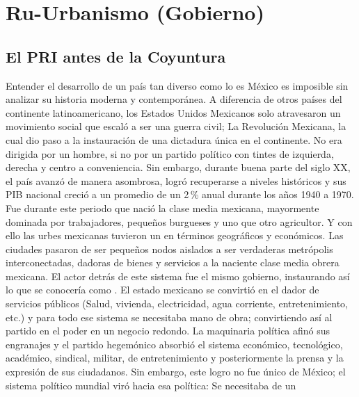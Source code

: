 
\section{Ru-Urbanismo (Gobierno)}
\label{sec:ru-urbanismo-gobierno}

\subsection{El PRI antes de la Coyuntura}
\label{ssec:PRI-pre-Coyuntura}

Entender el desarrollo de un país tan diverso como lo es México es imposible sin analizar su
historia moderna y contemporánea. A diferencia de otros países del continente latinoamericano, 
los Estados Unidos Mexicanos solo atravesaron un movimiento social que escaló a ser una guerra civil;
La Revolución Mexicana, la cual dio paso a la instauración de una dictadura única en el continente. No 
era dirigida por un hombre, si no por un partido político con tintes de izquierda, derecha y centro 
a conveniencia. Sin embargo, durante buena parte del siglo XX, el país avanzó de manera asombrosa, logró 
recuperarse a niveles históricos y sus PIB nacional creció a un promedio de un 2\,\% anual durante los años 
1940 a 1970. Fue durante este periodo que nació la clase media mexicana, mayormente dominada por trabajadores, 
pequeños burgueses y uno que otro agricultor. Y con ello las urbes mexicanas tuvieron un  en 
términos geográficos y económicos. Las ciudades pasaron de ser pequeños nodos aislados a ser verdaderas metrópolis
interconectadas, dadoras de bienes y servicios a la naciente clase media obrera mexicana. El actor detrás de este 
sistema fue el mismo gobierno, instaurando así lo que se conocería como . El estado 
mexicano se convirtió en el dador de servicios públicos (Salud, vivienda, electricidad, agua corriente, entretenimiento, etc.) 
y para todo ese sistema se necesitaba mano de obra; convirtiendo así al partido en el poder en un negocio redondo. 
La maquinaria política afinó sus engranajes y el partido hegemónico absorbió el sistema económico, tecnológico, 
académico, sindical, militar, de entretenimiento y posteriormente la prensa y la expresión de sus ciudadanos. \cite{agustin_tragicomedia1} Sin embargo, 
este logro no fue único de México; el sistema político mundial viró hacia esa política: Se necesitaba de un 
